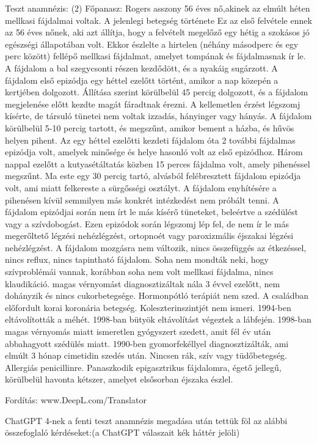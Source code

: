 \documentclass{article}
\begin{document}
\begin{multicols}{2}
Teszt anamnézis: (2)
Főpanasz: Rogers asszony 56 éves nő,akinek az elmúlt héten mellkasi fájdalmai voltak. 
A jelenlegi betegség története Ez az első felvétele ennek az 56 éves nőnek, aki azt állítja, hogy a felvételt megelőző egy hétig a szokásos jó egészségi állapotában volt. Ekkor észlelte a hirtelen (néhány másodperc és egy perc között) fellépő mellkasi fájdalmat, amelyet tompának és fájdalmasnak ír le. A fájdalom a bal szegycsonti részen kezdődött, és a nyakáig sugárzott. A fájdalom első epizódja egy héttel ezelőtt történt, amikor a nap közepén a kertjében dolgozott. Állítása szerint körülbelül 45 percig dolgozott, és a fájdalom megjelenése előtt kezdte magát fáradtnak érezni. A kellemetlen érzést légszomj kísérte, de társuló tünetei nem voltak izzadás, hányinger vagy hányás. A fájdalom körülbelül 5-10 percig tartott, és megszűnt, amikor bement a házba, és hűvös helyen pihent. 
Az egy héttel ezelőtti kezdeti fájdalom óta 2 további fájdalmas epizódja volt, amelyek minősége és helye hasonló volt az első epizódhoz. Három nappal ezelőtt a kutyasétáltatás közben 15 perces fájdalma volt, amely pihenéssel megszűnt. Ma este egy 30 percig tartó, alvásból felébresztett fájdalom epizódja volt, ami miatt felkereste a sürgősségi osztályt. A fájdalom enyhítésére a pihenésen kívül semmilyen más konkrét intézkedést nem próbált tenni. A fájdalom epizódjai során nem írt le más kísérő tüneteket, beleértve a szédülést vagy a szívdobogást. Ezen epizódok során légszomj lép fel, de nem ír le más megerőltető légzési nehézlégzést, ortopnoét vagy paroxizmális éjszakai légzési nehézlégzést. A fájdalom mozgásra nem változik, nincs összefüggés az étkezéssel, nincs reflux, nincs tapintható fájdalom. Soha nem mondták neki, hogy szívproblémái vannak, korábban soha nem volt mellkasi fájdalma, nincs klaudikáció. magas vérnyomást diagnosztizáltak nála 3 évvel ezelőtt, nem dohányzik és nincs cukorbetegsége. Hormonpótló terápiát nem szed. A családban előfordult korai koronária betegség. Koleszterinszintjét nem ismeri. 1994-ben eltávolították a méhét. 1998-ban bütyök eltávolítást végeztek a lábfején. 1998-ban magas vérnyomás miatt ismeretlen gyógyszert szedett, amit fél év után abbahagyott szédülés miatt. 1990-ben gyomorfekéllyel diagnosztizálták, ami elmúlt 3 hónap cimetidin szedés után. Nincsen rák, szív vagy tüdőbetegség. Allergiás penicillinre. Panaszkodik 
epigasztrikus fájdalomra, égető jellegű, körülbelül
havonta kétszer, amelyet elsősorban éjszaka észlel. 
 

Fordítás: www.DeepL.com/Translator 


ChatGPT 4-nek a fenti teszt anamnézis megadása után tettük föl az alábbi összefoglaló kérdéseket:(a ChatGPT válaszait kék háttér jelöli)


\end{multicols}
\end{document}
